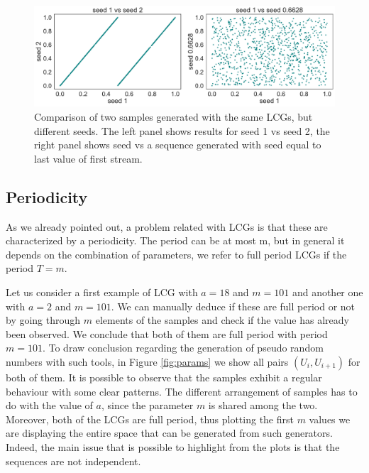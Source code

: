 \documentclass[twoside,onecolumn]{article}
\theoremstyle{definition}
\begin{document}
\begin{figure} \centering
         \includegraphics[width=\textwidth]{../results/seed_comparison.pdf}
\caption{Comparison of two samples generated with the same LCGs, but different seeds. The left panel shows results for seed 1 vs seed 2, the right panel shows seed vs a sequence generated with seed equal to  last value of first stream.}\label{fig:seeds}
\end{figure}

\subsection{Periodicity}
As we already pointed out, a problem related with LCGs is that these are characterized by a periodicity. The period can be at most m, but in general it depends on the combination of parameters, we refer to full period LCGs if the period $T=m$.
\par
Let us consider a first example of LCG with $a=18$ and $m=101$ and another one with  $a=2$ and $m=101$. 
We can manually deduce if these are full period or not by going through $m$ elements of the samples and check if the value has already been observed. We conclude that both of them are full period with period $m=101$.
To draw conclusion regarding the generation of pseudo random numbers with such tools, in Figure \ref{fig:params} we show all pairs $(U_i, U_{i+1})$ for both of them. It is possible to observe that the samples exhibit a regular behaviour with some clear patterns. The different arrangement of samples has to do with the value of $a$, since the parameter $m$ is shared among the two. Moreover, both of the LCGs are full period, thus plotting the first $m$ values we are displaying the entire space that can be generated from such generators. Indeed, the main issue that is possible to highlight from the plots is that the sequences are not independent. 
\end{document}
